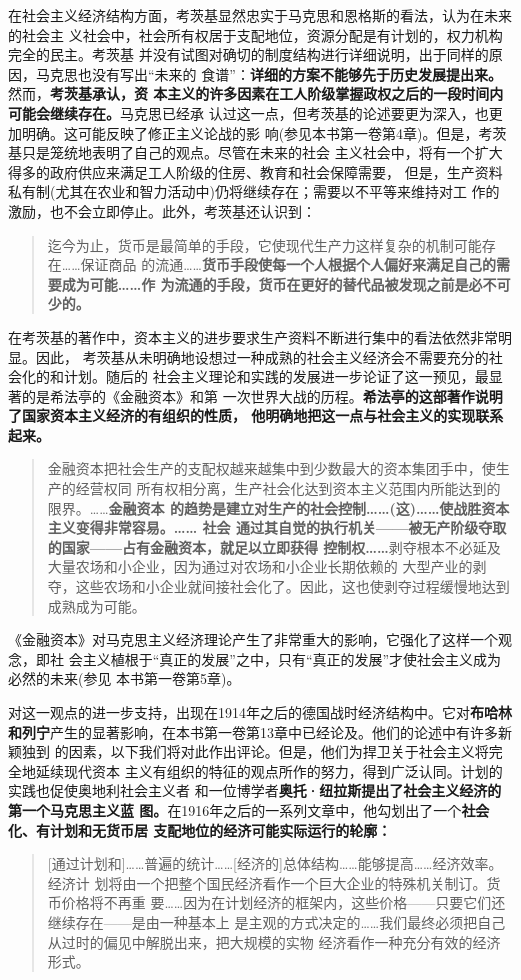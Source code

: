 在社会主义经济结构方面，考茨基显然忠实于马克思和恩格斯的看法，认为在未来的社会主
义社会中，社会所有权居于支配地位，资源分配是有计划的，权力机构完全的民主。考茨基
并没有试图对确切的制度结构进行详细说明，出于同样的原因，马克思也没有写出“未来的
食谱”：\textbf{详细的方案不能够先于历史发展提出来。}然而，\textbf{考茨基承认，资
  本主义的许多因素在工人阶级掌握政权之后的一段时间内可能会继续存在。}马克思已经承
认过这一点，但考茨基的论述要更为深入，也更加明确。这可能反映了修正主义论战的影
响(参见本书第一卷第4章)。但是，考茨基只是笼统地表明了自己的观点。尽管在未来的社会
主义社会中，将有一个扩大得多的政府供应来满足工人阶级的住房、教育和社会保障需要，
但是，生产资料私有制(尤其在农业和智力活动中)仍将继续存在；需要以不平等来维持对工
作的激励，也不会立即停止。此外，考茨基还认识到：
\begin{quotation}
  迄今为止，货币是最简单的手段，它使现代生产力这样复杂的机制可能存在……保证商品
  的流通……\textbf{货币手段使每一个人根据个人偏好来满足自己的需要成为可能……作
    为流通的手段，货币在更好的替代品被发现之前是必不可少的。}
\end{quotation}

在考茨基的著作中，资本主义的进步要求生产资料不断进行集中的看法依然非常明显。因此，
考茨基从未明确地设想过一种成熟的社会主义经济会不需要充分的社会化的和计划。随后的
社会主义理论和实践的发展进一步论证了这一预见，最显著的是希法亭的《金融资本》和第
一次世界大战的历程。\textbf{希法亭的这部著作说明了国家资本主义经济的有组织的性质，
  他明确地把这一点与社会主义的实现联系起来。}
\begin{quotation}
  金融资本把社会生产的支配权越来越集中到少数最大的资本集团手中，使生产的经营权同
  所有权相分离，生产社会化达到资本主义范围内所能达到的限界。……\textbf{金融资本
    的趋势是建立对生产的社会控制……(这)……使战胜资本主义变得非常容易。…… 社会
    通过其自觉的执行机关——被无产阶级夺取的国家——占有金融资本，就足以立即获得
    控制权……}剥夺根本不必延及大量农场和小企业，因为通过对农场和小企业长期依赖的
  大型产业的剥夺，这些农场和小企业就间接社会化了。因此，这也使剥夺过程缓慢地达到
  成熟成为可能。
\end{quotation}
《金融资本》对马克思主义经济理论产生了非常重大的影响，它强化了这样一个观念，即社
会主义植根于“真正的发展”之中，只有“真正的发展”才使社会主义成为必然的未来(参见
本书第一卷第5章)。

对这一观点的进一步支持，出现在1914年之后的德国战时经济结构中。它对\textbf{布哈林
  和列宁}产生的显著影响，在本书第一卷第13章中已经论及。他们的论述中有许多新颖独到
的因素，以下我们将对此作出评论。但是，他们为捍卫关于社会主义将完全地延续现代资本
主义有组织的特征的观点所作的努力，得到广泛认同。计划的实践也促使奥地利社会主义者
和一位博学者\textbf{奥托·纽拉斯提出了社会主义经济的第一个马克思主义蓝
  图。}在1916年之后的一系列文章中，他勾划出了一个\textbf{社会化、有计划和无货币居
  支配地位的经济可能实际运行的轮廓：}
\begin{quotation}
  [通过计划和]……普遍的统计……[经济的]总体结构……能够提高……经济效率。经济计
  划将由一个把整个国民经济看作一个巨大企业的特殊机关制订。货币价格将不再重
  要……因为在计划经济的框架内，这些价格——只要它们还继续存在——是由一种基本上
  是主观的方式决定的……我们最终必须把自己从过时的偏见中解脱出来，把大规模的实物
  经济看作一种充分有效的经济形式。
\end{quotation}

